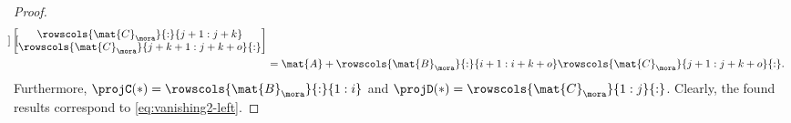 {\begin{proof}
\begin{equation*}
\begin{aligned}
\begin{bmatrix}
                                                \end{bmatrix} \begin{bmatrix}
                                                                  \rowscols{\mat{C}_{\mora}}{:}{j+1:j+k} \\
                                                                  \rowscols{\mat{C}_\mora}{j+k+1:j+k+o}{:}
                                                              \end{bmatrix} \\
                             & =\mat{A}+\rowscols{\mat{B}_\mora}{:}{i+1:i+k+o}\rowscols{\mat{C}_\mora}{j+1:j+k+o}{:}.
            \end{aligned}
        \end{equation*}
        Furthermore, $\projC(\ast) = \rowscols{\mat{B}_\mora}{:}{1:i}$ and $\projD(\ast) = \rowscols{\mat{C}_\mora}{1:j}{:}$.
        Clearly, the found results correspond to \cref{eq:vanishing2-left}.


\end{proof}}
